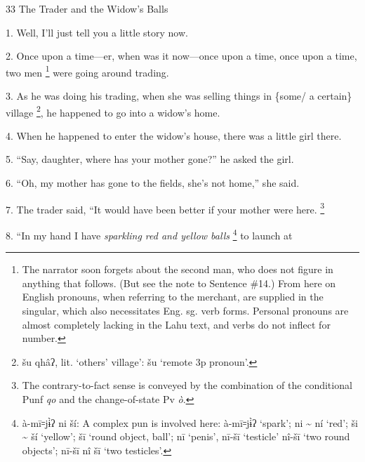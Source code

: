 
33 The Trader and the Widow's Balls

1. Well, I'll just tell you a little story now.

2. Once upon a time---er, when was it now---once upon a time, once upon a time,
two men \footnote{The narrator soon forgets about the second man, who does not figure in anything that follows. (But see the note to Sentence \#14.) From here on English pronouns, when referring to the merchant, are supplied in the singular, which also necessitates Eng. sg. verb forms. Personal pronouns are almost completely lacking in the Lahu text, and verbs do not inflect for number.} were going around trading.

3. As he was doing his trading, when she was selling things in \{some/ a certain\}
village \footnote{šu qhâʔ, lit. `others' village': šu `remote 3p pronoun'.}, he happened to go into a widow's home.

4. When he happened to enter the widow's house, there was a little girl there.

5. ``Say, daughter, where has your mother gone?'' he asked the girl.

6. ``Oh, my mother has gone to the fields, she's not home,'' she said.

7. The trader said, ``It would have been better if your mother were here. \footnote{The contrary-to-fact sense is conveyed by the combination of the conditional Punf \textit{qo} and the change-of-state Pv \textit{ò}.}

8. ``In my hand I have \textit{sparkling red and yellow balls} \footnote{à-mī꞊jɨ̀ʔ ni ší: A complex pun is involved here: à-mī꞊jɨ̀ʔ `spark'; ni \textasciitilde{} ní `red'; ši \textasciitilde{} ší `yellow'; šī `round object, ball'; nī `penis', nī-šī `testicle' nî-šī `two round objects'; nī-šī nî šī `two testicles'.} to launch at
